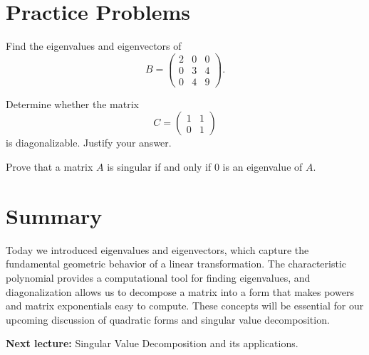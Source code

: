 \documentclass[
    language=english,
    doctype=lecture-notes,
    institution=none,
]{../../omnilatex}
\begin{document}
\section{Practice Problems}

\begin{problem}
Find the eigenvalues and eigenvectors of
\[
    B = \begin{pmatrix} 2 & 0 & 0 \\ 0 & 3 & 4 \\ 0 & 4 & 9 \end{pmatrix}.
\]
\end{problem}

\begin{problem}
Determine whether the matrix
\[
    C = \begin{pmatrix} 1 & 1 \\ 0 & 1 \end{pmatrix}
\]
is diagonalizable.  Justify your answer.
\end{problem}

\begin{problem}
Prove that a matrix $A$ is singular if and only if $0$ is an eigenvalue of $A$.
\end{problem}

\section{Summary}

Today we introduced eigenvalues and eigenvectors, which capture the fundamental
geometric behavior of a linear transformation.  The characteristic polynomial
provides a computational tool for finding eigenvalues, and diagonalization
allows us to decompose a matrix into a form that makes powers and matrix
exponentials easy to compute.  These concepts will be essential for our upcoming
discussion of quadratic forms and singular value decomposition.

\noindent\textbf{Next lecture:} Singular Value Decomposition and its applications.
\end{document}
